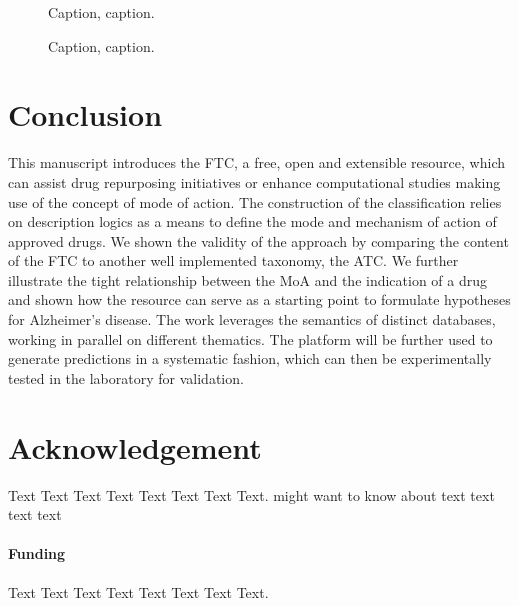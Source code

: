 \documentclass{bioinfo}
\begin{document}
\begin{figure}[!tpb]%
\caption{Caption, caption.}\label{fig:01}
\end{figure}

\begin{figure}[!tpb]%
\caption{Caption, caption.}\label{fig:02}
\end{figure}


%
%


\section{Conclusion}

This manuscript introduces the FTC, a free, open and extensible resource, which can assist drug repurposing 
initiatives or enhance computational studies making use of the concept of mode of action. The construction of 
the classification relies on description logics as a means to define the mode and mechanism of action of approved 
drugs. We shown the validity of the approach by comparing the content of the FTC to another well implemented taxonomy, 
the ATC. We further illustrate the tight relationship between the MoA and the indication of a drug and shown how the 
resource can serve as a starting point to formulate hypotheses for Alzheimer's disease. The work leverages the 
semantics of distinct databases, working in parallel on different thematics. The platform will be further used 
to generate predictions in a systematic fashion, which can then be experimentally tested in the laboratory for validation.

\section*{Acknowledgement}
Text Text Text Text Text Text  Text Text.  \citealp{Boffelli03} might want to know about  text text text text

\paragraph{Funding\textcolon} Text Text Text Text Text Text  Text Text.
\end{document}
